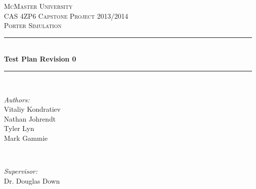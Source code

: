 \documentclass[paper=letter, fontsize=10pt]{scrartcl}
\numberwithin{equation}{section}		%
\numberwithin{figure}{section}			%
\numberwithin{table}{section}				%
\begin{document}
\begin{titlepage}

\newcommand{\HRule}{\rule{\linewidth}{0.5mm}} %

\begin{center}
 

\textsc{\LARGE McMaster University}\\[1.5cm] %
\textsc{\Large CAS 4ZP6 Capstone Project 2013/2014}\\[0.5cm] %
\textsc{\large Porter Simulation}\\[0.5cm] %


\HRule \\[0.4cm]
{ \huge \bfseries Test Plan Revision 0}\\[0.4cm] %
\HRule \\[1.5cm]
 

\begin{minipage}{0.4\textwidth}
\begin{flushleft} \large
\emph{Authors:}\\
Vitaliy Kondratiev\\
Nathan Johrendt\\
Tyler Lyn\\
Mark Gammie
\end{flushleft}
\end{minipage}
~
\begin{minipage}{0.4\textwidth}
\begin{flushright} \large
\emph{Supervisor:} \\
Dr. Douglas Down %
\end{flushright}
\end{minipage}\\[4cm]


\end{center}
\end{titlepage}
\end{document}

